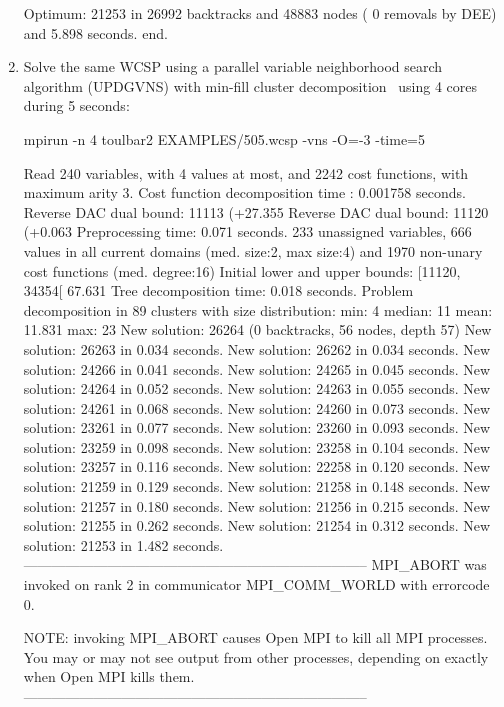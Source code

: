\begin{enumerate}
{\begin{DoxyCode}
Optimum: 21253 in 26992 backtracks and 48883 nodes ( 0 removals by DEE) and 5.898 seconds.
end.
\end{DoxyCode}}
\item Solve the same WCSP using a parallel variable neighborhood search algorithm (UPDGVNS) with min-fill cluster decomposition~\cite{Ouali17} using 4 cores during 5 seconds:
\begin{DoxyCode}
	mpirun -n 4 toulbar2 EXAMPLES/505.wcsp -vns -O=-3 -time=5
\end{DoxyCode}
{\scriptsize
\begin{DoxyCode}
Read 240 variables, with 4 values at most, and 2242 cost functions, with maximum arity 3.
Cost function decomposition time : 0.001758 seconds.
Reverse DAC dual bound: 11113 (+27.355%
Reverse DAC dual bound: 11120 (+0.063%
Preprocessing time: 0.071 seconds.
233 unassigned variables, 666 values in all current domains (med. size:2, max size:4) and 1970 non-unary cost functions (med. degree:16)
Initial lower and upper bounds: [11120, 34354[ 67.631%
Tree decomposition time: 0.018 seconds.
Problem decomposition in 89 clusters with size distribution: min: 4 median: 11 mean: 11.831 max: 23
New solution: 26264 (0 backtracks, 56 nodes, depth 57)
New solution: 26263 in 0.034 seconds.
New solution: 26262 in 0.034 seconds.
New solution: 24266 in 0.041 seconds.
New solution: 24265 in 0.045 seconds.
New solution: 24264 in 0.052 seconds.
New solution: 24263 in 0.055 seconds.
New solution: 24261 in 0.068 seconds.
New solution: 24260 in 0.073 seconds.
New solution: 23261 in 0.077 seconds.
New solution: 23260 in 0.093 seconds.
New solution: 23259 in 0.098 seconds.
New solution: 23258 in 0.104 seconds.
New solution: 23257 in 0.116 seconds.
New solution: 22258 in 0.120 seconds.
New solution: 21259 in 0.129 seconds.
New solution: 21258 in 0.148 seconds.
New solution: 21257 in 0.180 seconds.
New solution: 21256 in 0.215 seconds.
New solution: 21255 in 0.262 seconds.
New solution: 21254 in 0.312 seconds.
New solution: 21253 in 1.482 seconds.
--------------------------------------------------------------------------
MPI_ABORT was invoked on rank 2 in communicator MPI_COMM_WORLD 
with errorcode 0.

NOTE: invoking MPI_ABORT causes Open MPI to kill all MPI processes.
You may or may not see output from other processes, depending on
exactly when Open MPI kills them.
--------------------------------------------------------------------------


\end{DoxyCode}}
\end{enumerate}
